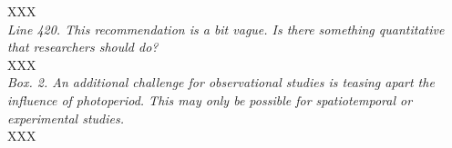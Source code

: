 \documentclass[11pt]{article}
\begin{document}
XXX\\

\emph{Line 420. This recommendation is a bit vague. Is there something quantitative that
researchers should do?}\\

XXX\\

\emph{Box. 2. An additional challenge for observational studies is teasing apart the influence of
photoperiod. This may only be possible for spatiotemporal or experimental studies.}\\

XXX\\

\newpage


\end{document}
